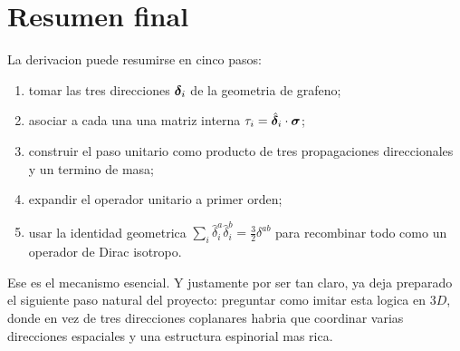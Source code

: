 \section{Resumen final}

La derivacion puede resumirse en cinco pasos:

\begin{enumerate}[leftmargin=*]
  \item tomar las tres direcciones \(\bm{\delta}_i\) de la geometria de grafeno;
  \item asociar a cada una una matriz interna \(\tau_i=\hat{\bm{\delta}}_i\cdot \bm{\sigma}\);
  \item construir el paso unitario como producto de tres propagaciones direccionales y un termino de masa;
  \item expandir el operador unitario a primer orden;
  \item usar la identidad geometrica \(\sum_i \hat{\delta}_i^a\hat{\delta}_i^b=\tfrac{3}{2}\delta^{ab}\) para recombinar todo como un operador de Dirac isotropo.
\end{enumerate}

Ese es el mecanismo esencial. Y justamente por ser tan claro, ya deja preparado el siguiente paso natural del proyecto: preguntar como imitar esta logica en \(3D\), donde en vez de tres direcciones coplanares habria que coordinar varias direcciones espaciales y una estructura espinorial mas rica.

